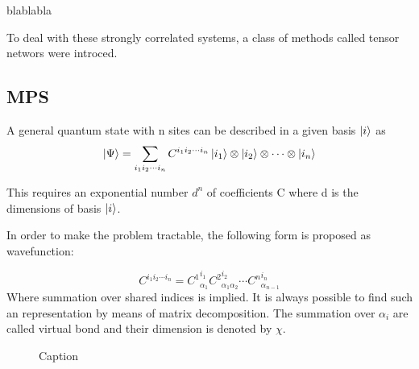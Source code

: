 blablabla

To deal with these strongly correlated systems, a class of methods called tensor networs were introced.


\subsection{MPS}

A general quantum state with n sites can be described in a given basis $\ket{i}$ as 
\begin{equation}
    \ket{\Psi} = \sum_{i_1 i_2 \cdots i_n } C^{i_1 i_2 \cdots i_n} \ket{i_1} \otimes \ket{i_2} \otimes \cdots \otimes \ket{i_n}
\end{equation}

This requires an exponential number $d^n$ of coefficients C where d is the dimensions of basis $\ket{i}$.





In order to make the problem tractable, the following form is proposed as wavefunction:

\begin{equation}
    C^{i_1 i_2 \cdots i_n} = {C^{1}}_{\alpha_1}^{ i_1} {C^{2}}_{\alpha_1 \alpha_2}^{i_2} \cdots  {C^{n}}_{\alpha_{n-1} }^{i_n}
\end{equation}
Where summation over shared indices is implied. It is always possible to find such an representation by means of matrix decomposition. The summation over $\alpha_i$ are called virtual bond and their dimension is denoted by $\chi$.


\begin{figure}
    \centering
   

    \caption{Caption}
    \label{fig:my_label}
\end{figure}



